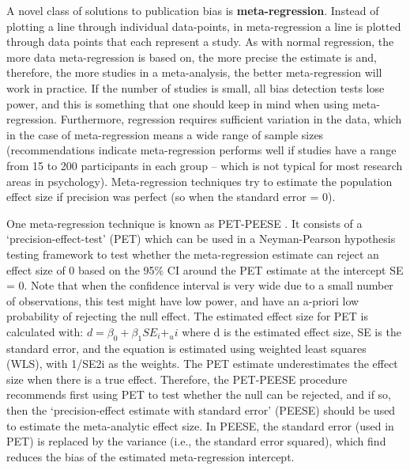 \documentclass[
  oneside]{krantz}
\begin{document}
A novel class of solutions to publication bias is \textbf{meta-regression}. Instead of plotting a line through individual data-points, in meta-regression a line is plotted through data points that each represent a study. As with normal regression, the more data meta-regression is based on, the more precise the estimate is and, therefore, the more studies in a meta-analysis, the better meta-regression will work in practice. If the number of studies is small, all bias detection tests lose power, and this is something that one should keep in mind when using meta-regression. Furthermore, regression requires sufficient variation in the data, which in the case of meta-regression means a wide range of sample sizes (recommendations indicate meta-regression performs well if studies have a range from 15 to 200 participants in each group -- which is not typical for most research areas in psychology). Meta-regression techniques try to estimate the population effect size if precision was perfect (so when the standard error = 0).

One meta-regression technique is known as PET-PEESE \citep{stanley_meta-regression_2014, stanley_finding_2017}. It consists of a `precision-effect-test' (PET) which can be used in a Neyman-Pearson hypothesis testing framework to test whether the meta-regression estimate can reject an effect size of 0 based on the 95\% CI around the PET estimate at the intercept SE = 0. Note that when the confidence interval is very wide due to a small number of observations, this test might have low power, and have an a-priori low probability of rejecting the null effect. The estimated effect size for PET is calculated with: \(d = β_0 + β_1SE_i + _ui\) where d is the estimated effect size, SE is the standard error, and the equation is estimated using weighted least squares (WLS), with 1/SE2i as the weights. The PET estimate underestimates the effect size when there is a true effect. Therefore, the PET-PEESE procedure recommends first using PET to test whether the null can be rejected, and if so, then the `precision-effect estimate with standard error' (PEESE) should be used to estimate the meta-analytic effect size. In PEESE, the standard error (used in PET) is replaced by the variance (i.e., the standard error squared), which \citet{stanley_meta-regression_2014} find reduces the bias of the estimated meta-regression intercept.
\end{document}
